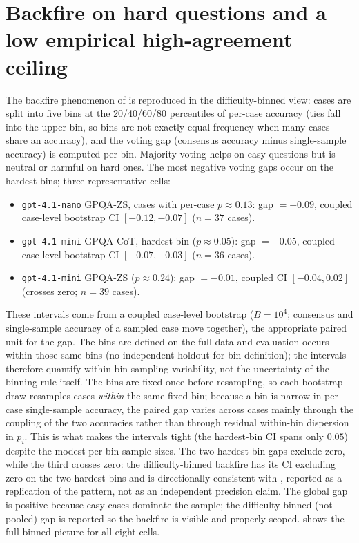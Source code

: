 \documentclass[a4paper,fleqn]{cas-sc}
\begin{document}
\section{Backfire on hard questions and a low empirical high-agreement ceiling}
\label{app:backfire}

The backfire phenomenon of \cite{bahuguna2026when} is reproduced in the
difficulty-binned view: cases are split into five bins at the
20/40/60/80 percentiles of per-case accuracy (ties fall into the upper
bin, so bins are not exactly equal-frequency when many cases share an
accuracy), and the voting gap (consensus accuracy minus single-sample
accuracy) is computed per bin. Majority voting helps
on easy questions but is neutral or
harmful on hard ones. The most negative voting gaps occur on the hardest
bins; three representative cells:
\begin{itemize}
\item \texttt{gpt-4.1-nano} GPQA-ZS, cases with per-case $p\approx0.13$:
  gap $= -0.09$, coupled case-level bootstrap CI $[-0.12, -0.07]$ ($n=37$ cases).
\item \texttt{gpt-4.1-mini} GPQA-CoT, hardest bin ($p\approx0.05$):
  gap $= -0.05$, coupled case-level bootstrap CI $[-0.07, -0.03]$ ($n=36$ cases).
\item \texttt{gpt-4.1-mini} GPQA-ZS ($p\approx0.24$): gap $= -0.01$,
  coupled CI $[-0.04, 0.02]$ (crosses zero; $n=39$ cases).
\end{itemize}
These intervals come from a coupled case-level bootstrap ($B=10^4$; consensus and single-sample accuracy of a sampled case move together), the appropriate paired unit for the gap. The bins are defined on the full data and evaluation occurs within those same bins (no independent holdout for bin definition); the intervals therefore quantify within-bin sampling variability, not the uncertainty of the binning rule itself. The bins are fixed once before resampling, so each bootstrap draw resamples cases \emph{within} the same fixed bin; because a bin is narrow in per-case single-sample accuracy, the paired gap varies across cases mainly through the coupling of the two accuracies rather than through residual within-bin dispersion in $p_i$. This is what makes the intervals tight (the hardest-bin CI spans only $0.05$) despite the modest per-bin sample sizes. The two hardest-bin gaps exclude zero, while the third crosses
zero: the difficulty-binned backfire has its CI excluding zero on the
two hardest bins and is directionally consistent with
\cite{bahuguna2026when}, reported as a replication of the pattern,
not as an
independent precision claim.
The global gap is positive because easy cases dominate the sample; the difficulty-binned (not pooled) gap is reported so the backfire is visible
and properly scoped.  shows the full binned picture
for all eight cells.
\end{document}
